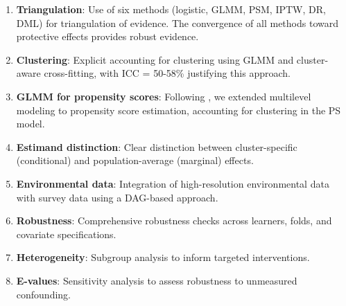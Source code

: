 \begin{enumerate}
	\item \textbf{Triangulation}: Use of six methods (logistic, GLMM, PSM, IPTW, DR, DML) for triangulation of evidence. The convergence of all methods toward protective effects provides robust evidence.
	
	\item \textbf{Clustering}: Explicit accounting for clustering using GLMM and cluster-aware cross-fitting, with ICC = 50-58\% justifying this approach.
	
	\item \textbf{GLMM for propensity scores}: Following \citet{ayele2024assessment}, we extended multilevel modeling to propensity score estimation, accounting for clustering in the PS model.
	
	\item \textbf{Estimand distinction}: Clear distinction between cluster-specific (conditional) and population-average (marginal) effects.
	
	\item \textbf{Environmental data}: Integration of high-resolution environmental data with survey data using a DAG-based approach.
	
	\item \textbf{Robustness}: Comprehensive robustness checks across learners, folds, and covariate specifications.
	
	\item \textbf{Heterogeneity}: Subgroup analysis to inform targeted interventions.
	
	\item \textbf{E-values}: Sensitivity analysis to assess robustness to unmeasured confounding.
\end{enumerate}